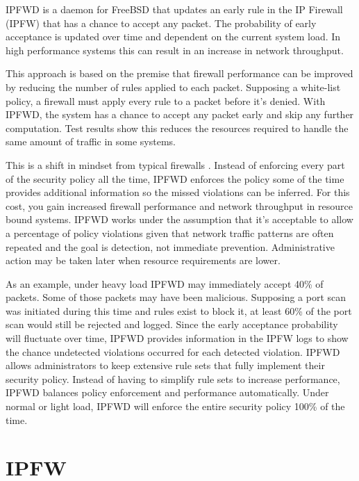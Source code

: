 \documentclass[journal]{IEEEtran}
\begin{document}
  IPFWD is a daemon for FreeBSD that updates an early rule in the IP Firewall
  (IPFW) that has a chance to accept any packet. The probability of early
  acceptance is updated over time and dependent on the current system load. In
  high performance systems this can result in an increase in network
  throughput.

  This approach is based on the premise that firewall performance can be
  improved by reducing the number of rules applied to each packet. Supposing a
  white-list policy, a firewall must apply every rule to a packet before
  it's denied.  With IPFWD, the system has a chance to accept any packet early
  and skip any further computation. Test results show this reduces the 
  resources required to handle the same amount of traffic in some systems.

  This is a shift in mindset from typical firewalls \cite{networksecurity}.
  Instead of enforcing every part of the security policy all the time, IPFWD
  enforces the policy some of the time provides additional information so the
  missed violations can be inferred. For this cost, you gain increased firewall
  performance and network throughput in resource bound systems. IPFWD works
  under the assumption that it's acceptable to allow a percentage of policy
  violations given that network traffic patterns are often repeated and the
  goal is detection, not immediate prevention. Administrative action may be
  taken later when resource requirements are lower.

  As an example, under heavy load IPFWD may immediately accept 40\% of packets.
  Some of those packets may have been malicious. Supposing a port scan was
  initiated during this time and rules exist to block it, at least 60\% of the
  port scan would still be rejected and logged. Since the early acceptance
  probability will fluctuate over time, IPFWD provides information in the IPFW
  logs to show the chance undetected violations occurred for each detected
  violation. IPFWD allows administrators to keep extensive rule sets that fully
  implement their security policy. Instead of having to simplify rule sets to
  increase performance, IPFWD balances policy enforcement and performance
  automatically. Under normal or light load, IPFWD will enforce the entire
  security policy 100\% of the time.

\section{IPFW}
\end{document}
